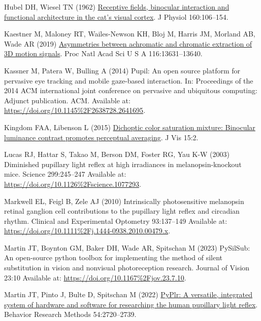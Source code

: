 \documentclass[
]{article}
\newlength{\cslhangindent}
\newenvironment{CSLReferences}[2] %
 {\begin{list}{}{%
  \setlength{\itemindent}{0pt}
  \setlength{\leftmargin}{0pt}
  \setlength{\parsep}{0pt}
  \ifodd #1
   \setlength{\leftmargin}{\cslhangindent}
   \setlength{\itemindent}{-1\cslhangindent}
  \fi
  \setlength{\itemsep}{#2\baselineskip}}}
 {\end{list}}
\begin{document}
\begin{CSLReferences}{1}{1}
Hubel DH, Wiesel TN (1962) \href{https://doi.org/10.1113/jphysiol.1962.sp006837}{Receptive fields, binocular interaction and functional architecture in the cat's visual cortex}. J Physiol 160:106--154.

Kaestner M, Maloney RT, Wailes-Newson KH, Bloj M, Harris JM, Morland AB, Wade AR (2019) \href{https://doi.org/10.1073/pnas.1817202116}{Asymmetries between achromatic and chromatic extraction of 3D motion signals}. Proc Natl Acad Sci U S A 116:13631--13640.

Kassner M, Patera W, Bulling A (2014) Pupil: An open source platform for pervasive eye tracking and mobile gaze-based interaction. In: Proceedings of the 2014 {ACM} international joint conference on pervasive and ubiquitous computing: Adjunct publication. {ACM}. Available at: \url{https://doi.org/10.1145\%2F2638728.2641695}.

Kingdom FAA, Libenson L (2015) \href{https://doi.org/10.1167/15.5.2}{Dichoptic color saturation mixture: Binocular luminance contrast promotes perceptual averaging}. J Vis 15:2.

Lucas RJ, Hattar S, Takao M, Berson DM, Foster RG, Yau K-W (2003) Diminished pupillary light reflex at high irradiances in melanopsin-knockout mice. Science 299:245--247 Available at: \url{https://doi.org/10.1126\%2Fscience.1077293}.

Markwell EL, Feigl B, Zele AJ (2010) Intrinsically photosensitive melanopsin retinal ganglion cell contributions to the pupillary light reflex and circadian rhythm. Clinical and Experimental Optometry 93:137--149 Available at: \url{https://doi.org/10.1111\%2Fj.1444-0938.2010.00479.x}.

Martin JT, Boynton GM, Baker DH, Wade AR, Spitschan M (2023) PySilSub: An open-source python toolbox for implementing the method of silent substitution in vision and nonvisual photoreception research. Journal of Vision 23:10 Available at: \url{https://doi.org/10.1167\%2Fjov.23.7.10}.

Martin JT, Pinto J, Bulte D, Spitschan M (2022) \href{https://doi.org/10.3758/s13428-021-01759-3}{PyPlr: A versatile, integrated system of hardware and software for researching the human pupillary light reflex}. Behavior Research Methods 54:2720--2739.


\end{CSLReferences}
\end{document}
